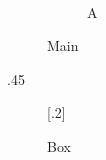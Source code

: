 \documentclass{article}
\begin{document}
\begin{figure}
\begin{subfigure}[t]{.28\textwidth}\the\linewidth\ \the\hsize\ \the\textwidth\ \the\columnwidth\caption{A}\end{subfigure}
\begin{minipage}[t]{.2\textwidth}\the\linewidth\end{minipage}
\caption{Main}
\end{figure}
\begin{table}
\begin{subtable}{.45\textwidth}\the\linewidth\caption{T}\end{subtable}
\caption{Tab}
\end{table}
\begin{figure}
[.2\textwidth]{\the\linewidth\ \the\hsize\ \the\textwidth\ \the\columnwidth}
\caption{Box}
\end{figure}
\end{document}
